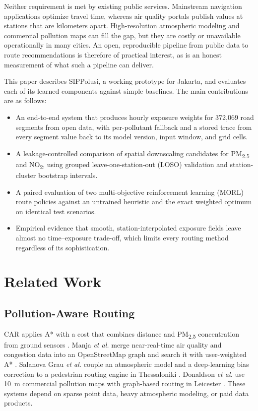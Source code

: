 \documentclass[conference]{IEEEtran}
\newcommand{\pmtf}{PM\textsubscript{2.5}}
\newcommand{\notwo}{NO\textsubscript{2}}
\begin{document}
Neither requirement is met by existing public services. Mainstream navigation applications optimize travel time, whereas air quality portals publish values at stations that are kilometers apart. High-resolution atmospheric modeling and commercial pollution maps can fill the gap, but they are costly or unavailable operationally in many cities. An open, reproducible pipeline from public data to route recommendations is therefore of practical interest, as is an honest measurement of what such a pipeline can deliver.

This paper describes SIPPolusi, a working prototype for Jakarta, and evaluates each of its learned components against simple baselines. The main contributions are as follows:
\begin{itemize}
\item An end-to-end system that produces hourly exposure weights for 372,069 road segments from open data, with per-pollutant fallback and a stored trace from every segment value back to its model version, input window, and grid cells.
\item A leakage-controlled comparison of spatial downscaling candidates for \pmtf{} and \notwo{}, using grouped leave-one-station-out (LOSO) validation and station-cluster bootstrap intervals.
\item A paired evaluation of two multi-objective reinforcement learning (MORL) route policies against an untrained heuristic and the exact weighted optimum on identical test scenarios.
\item Empirical evidence that smooth, station-interpolated exposure fields leave almost no time--exposure trade-off, which limits every routing method regardless of its sophistication.
\end{itemize}

\section{Related Work}

\subsection{Pollution-Aware Routing}

CAR applies A* \cite{hart1968} with a cost that combines distance and \pmtf{} concentration from ground sensors \cite{mahajan2019}. Manja \textit{et al.} merge near-real-time air quality and congestion data into an OpenStreetMap graph and search it with user-weighted A* \cite{manja2024}. Salanova Grau \textit{et al.} couple an atmospheric model and a deep-learning bias correction to a pedestrian routing engine in Thessaloniki \cite{salanova2026}. Donaldson \textit{et al.} use 10~m commercial pollution maps with graph-based routing in Leicester \cite{donaldson2026}. These systems depend on sparse point data, heavy atmospheric modeling, or paid data products.
\end{document}

